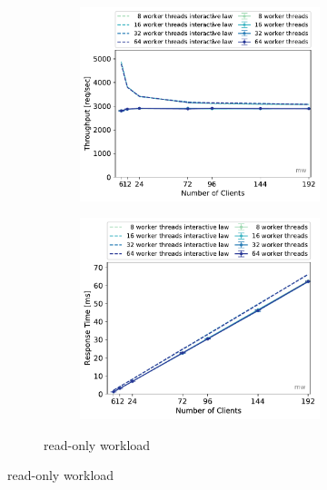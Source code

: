 \documentclass[report.tex]{subfiles}
\begin{document}
\begin{figure}[H]
\begin{subfigure}{\linewidth}
	\begin{subfigure}[b]{.49\linewidth}
		\centering
		\includegraphics[width=\linewidth]{data/exp32_ro_tp_nc_w.pdf}
	\end{subfigure}\hfill
	\begin{subfigure}[b]{.49\linewidth}
		\centering
		\includegraphics[width=\linewidth]{data/exp32_ro_rt_nc_w.pdf}
	\end{subfigure}%
	\caption{read-only workload}\label{exp32_ro_tp_nc}

\end{subfigure}
\end{figure}
\end{document}
